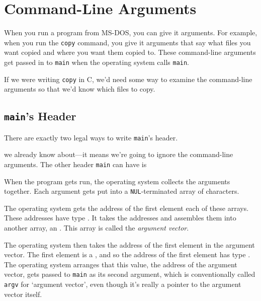 \section{Command-Line Arguments}

When you run a program from MS-DOS, you can give it arguments.  For
example, when you run the {\tt copy} command, you  give it arguments
that say what files you want copied and where you want them copied to.
These command-line arguments get passed in to {\tt main} when the
operating system calls {\tt main}.

If we were writing {\tt copy} in C, we'd need some way to examine the
command-line arguments so that we'd know which files to copy.

\subsection{{\tt main}'s Header}

There are exactly two legal ways to write {\tt main}'s header. 

\begin{flushleft}
\verb% int main(void)% \\*
\end{flushleft}

\noindent we already know about---it means we're going to ignore the
command-line arguments.  The other header {\tt main} can have is

\begin{flushleft}
\verb% int main(int argc, char **argv)% \\*
\end{flushleft}

When the program gets run, the operating system collects the arguments
together.  Each argument gets put into a {\tt NUL}-terminated array of
characters.

The operating system gets the address of the first element each of these
arrays.  These addresses have type \Char.  It takes the addresses and
assembles them into another array, an .  This array
is called the {\em argument vector}\/.

The operating system then takes the address of the first element in the
argument vector.  The first element is a \Char, and so the address of
the first element has type .  The operating system
arranges that this value, the address of the argument vector, gets
passed to {\tt main} as its second argument, which is conventionally
called {\tt argv} for `argument vector', even though it's really a
pointer to the argument vector itself.

